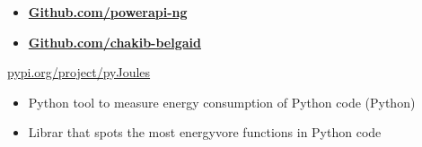 \documentclass[10pt,a4paper,ragged2e,withhyper]{altacv}
\begin{document}
\begin{paracol}{2}
  \switchcolumn



  \medskip












  \begin{itemize}
    \item   \textbf{\color{accent}\href{https://github.com/powerapi-ng}
            {Github.com/powerapi-ng}}
    \item \textbf{\color{accent}\href{https://github.com/chakib-belgaid}
            {Github.com/chakib-belgaid}}
  \end{itemize}

  \divider
   {\href{https://pypi.org/project/pyJoules}{pypi.org/project/pyJoules}}{}{}
  \begin{itemize}
    \item  Python tool to measure energy consumption of Python code (Python)
  \end{itemize}

  \divider
  \begin{itemize}
    \item  Librar that spots the most  energyvore functions in Python code
  \end{itemize}



\end{paracol}
\end{document}
